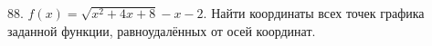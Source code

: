 88. $f(x)=\sqrt{x^2+4x+8}-x-2.$ Найти координаты всех точек графика заданной функции,
равноудалённых от осей координат.\\

